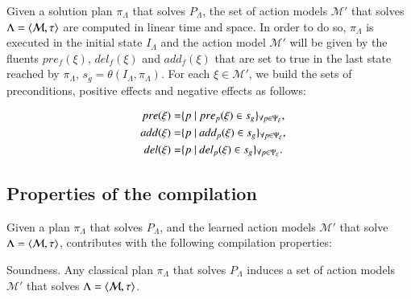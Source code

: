 Given a solution plan $\pi_\Lambda$ that solves $P_{\Lambda}$, the set of action models $\mathcal{M}'$ that solves $\Lambda={\langle \mathcal{M},\tau \rangle}$ are computed in linear time and space. In order to do so, $\pi_\Lambda$ is executed in the initial state $I_{\Lambda}$ and the action model $\mathcal{M}'$ will be given by the fluents $pre_f(\xi)$, $del_f(\xi)$ and $add_f(\xi)$ that are set to true in the last state reached by $\pi_\Lambda$, $s_g=\theta(I_\Lambda,\pi_\Lambda)$. For each $\xi \in \mathcal{M'}$, we build the sets of preconditions, positive effects and negative effects as follows:


\begin{small}
	\begin{align*}
	\hspace*{7pt}pre(\xi)=& \{p ~|~ pre_p(\xi) \in s_g\}_{\forall p \in \Psi_\xi},\\
	\hspace*{7pt}add(\xi)=& \{p ~|~ add_p(\xi) \in s_g\}_{\forall p \in \Psi_\xi},\\
	\hspace*{7pt}del(\xi)=& \{p ~|~ del_p(\xi) \in s_g\}_{\forall p \in \Psi_\xi}.
	\end{align*}
\end{small}


\subsection{Properties of the compilation}

Given a plan $\pi_\Lambda$ that solves $P_\Lambda$, and the learned action models $\mathcal{M'}$ that solve $\Lambda={\langle \mathcal{M}, \tau \rangle}$, \FAMA contributes with the following compilation properties:

\begin{mylemma}
Soundness. Any classical plan $\pi_\Lambda$ that solves $P_{\Lambda}$ induces a set of action models $\mathcal{M}'$ that solves $\Lambda={\langle \mathcal{M},\tau \rangle}$.
\end{mylemma}

